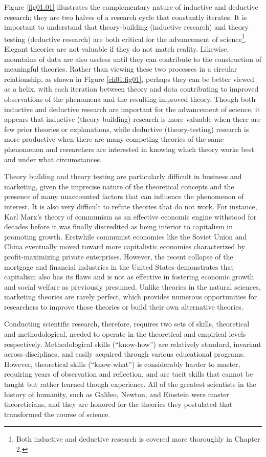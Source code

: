 Figure \ref{fig01.01} illustrates the complementary nature of inductive and deductive research; they are two halves of a research cycle that constantly iterates. It is important to understand that theory-building (inductive research) and theory testing (deductive research) are both critical for the advancement of science\footnote{Both inductive and deductive research is covered more thoroughly in Chapter 2.}. Elegant theories are not valuable if they do not match reality. Likewise, mountains of data are also useless until they can contribute to the construction of meaningful theories. Rather than viewing these two processes in a circular relationship, as shown in Figure \ref{ch01.fig01}, perhaps they can be better viewed as a helix, with each iteration between theory and data contributing to improved observations of the phenomena and the resulting improved theory. Though both inductive and deductive research are important for the advancement of science, it appears that inductive (theory-building) research is more valuable when there are few prior theories or explanations, while deductive (theory-testing) research is more productive when there are many competing theories of the same phenomenon and researchers are interested in knowing which theory works best and under what circumstances.

Theory building and theory testing are particularly difficult in business and marketing, given the imprecise nature of the theoretical concepts and the presence of many unaccounted factors that can influence the phenomenon of interest. It is also very difficult to refute theories that do not work. For instance, Karl Marx's theory of communism as an effective economic engine withstood for decades before it was finally discredited as being inferior to capitalism in promoting growth. Erstwhile communist economies like the Soviet Union and China eventually moved toward more capitalistic economies characterized by profit-maximizing private enterprises. However, the recent collapse of the mortgage and financial industries in the United States demonstrates that capitalism also has its flaws and is not as effective in fostering economic growth and social welfare as previously presumed. Unlike theories in the natural sciences, marketing theories are rarely perfect, which provides numerous opportunities for researchers to improve those theories or build their own alternative theories.

Conducting scientific research, therefore, requires two sets of skills, theoretical and methodological, needed to operate in the theoretical and empirical levels respectively. Methodological skills (``know-how'') are relatively standard, invariant across disciplines, and easily acquired through various educational programs. However, theoretical skills (``know-what'') is considerably harder to master, requiring years of observation and reflection, and are tacit skills that cannot be taught but rather learned though experience. All of the greatest scientists in the history of humanity, such as Galileo, Newton, and Einstein were master theoreticians, and they are honored for the theories they postulated that transformed the course of science.

